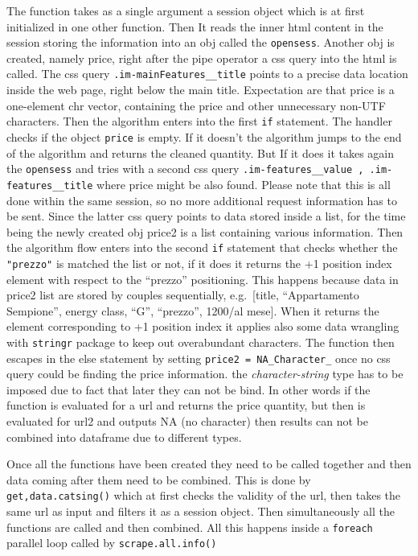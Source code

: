 \documentclass[
  12pt,
  a4paper,
  oneside]{book}
\begin{document}
The function takes as a single argument a session object which is at first initialized in one other function. Then It reads the inner html content in the session storing the information into an obj called the \texttt{opensess}. Another obj is created, namely price, right after the pipe operator a css query into the html is called. The css query \texttt{.im-mainFeatures\_\_title} points to a precise data location inside the web page, right below the main title. Expectation are that price is a one-element chr vector, containing the price and other unnecessary non-UTF characters. Then the algorithm enters into the first \texttt{if} statement. The handler checks if the object \texttt{price} is empty. If it doesn't the algorithm jumps to the end of the algorithm and returns the cleaned quantity. But If it does it takes again the \texttt{opensess} and tries with a second css query \texttt{.im-features\_\_value\ ,\ .im-features\_\_title} where price might be also found. Please note that this is all done within the same session, so no more additional request information has to be sent. Since the latter css query points to data stored inside a list, for the time being the newly created obj price2 is a list containing various information. Then the algorithm flow enters into the second \texttt{if} statement that checks whether the \texttt{"prezzo"} is matched the list or not, if it does it returns the +1 position index element with respect to the ``prezzo'' positioning. This happens because data in price2 list are stored by couples sequentially, e.g.~{[}title, ``Appartamento Sempione'', energy class, ``G'', ``prezzo'', 1200/al mese{]}. When it returns the element corresponding to +1 position index it applies also some data wrangling with \texttt{stringr} package to keep out overabundant characters. The function then escapes in the else statement by setting \texttt{price2\ =\ NA\_Character\_} once no css query could be finding the price information. the \emph{character-string} type has to be imposed due to fact that later they can not be bind. In other words if the function is evaluated for a url and returns the price quantity, but then is evaluated for url2 and outputs NA (no character) then results can not be combined into dataframe due to different types.

Once all the functions have been created they need to be called together and then data coming after them need to be combined. This is done by \texttt{get,data.catsing()} which at first checks the validity of the url, then takes the same url as input and filters it as a session object. Then simultaneously all the functions are called and then combined. All this happens inside a \texttt{foreach} parallel loop called by \texttt{scrape.all.info()}
\end{document}
